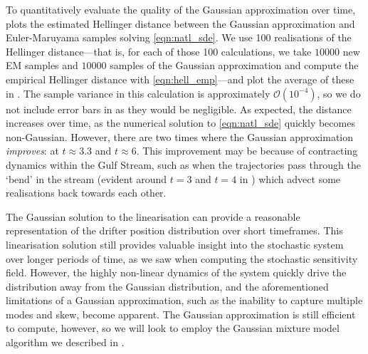 To quantitatively evaluate the quality of the Gaussian approximation over time,  plots the estimated Hellinger distance between the Gaussian approximation and Euler-Maruyama samples solving \cref{eqn:natl_sde}.
We use 100 realisations of the Hellinger distance---that is, for each of those 100 calculations, we take \(10000\) new EM samples and \(10000\) samples of the Gaussian approximation and compute the empirical Hellinger distance with \cref{eqn:hell_emp}---and plot the average of these in .
The sample variance in this calculation is approximately \(\mathcal{O}\!\left(10^{-4}\right)\), so we do not include error bars in  as they would be negligible.
As expected, the distance increases over time, as the numerical solution to \cref{eqn:natl_sde} quickly becomes non-Gaussian.
However, there are two times where the Gaussian approximation \emph{improves}: at \(t \approx 3.3\) and \(t \approx 6\).
This improvement may be because of contracting dynamics within the Gulf Stream, such as when the trajectories pass through the `bend' in the stream (evident around \(t = 3\) and \(t = 4\) in ) which advect some realisations back towards each other.

The Gaussian solution to the linearisation can provide a reasonable representation of the drifter position distribution over short timeframes.
This linearisation solution still provides valuable insight into the stochastic system over longer periods of time, as we saw when computing the stochastic sensitivity field.
However, the highly non-linear dynamics of the system quickly drive the distribution away from the Gaussian distribution, and the aforementioned limitations of a Gaussian approximation, such as the inability to capture multiple modes and skew, become apparent.
The Gaussian approximation is still efficient to compute, however, so we will look to employ the Gaussian mixture model algorithm we described in .


